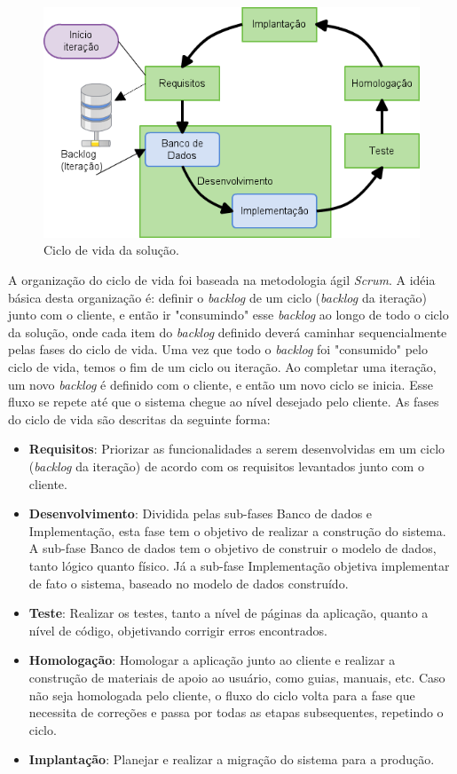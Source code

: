 \begin{figure}[!htb]
	\centering
		\includegraphics[scale=0.8]{figuras/ciclo_vida_solucao}
	\caption{Ciclo de vida da solução.}
	\label{ciclo_vida_solucao}
\end{figure}

A organização do ciclo de vida foi baseada na metodologia ágil \textit{Scrum}. A idéia básica desta organização é: definir o \textit{backlog} de um ciclo (\textit{backlog} da iteração) junto com o cliente, e então ir "consumindo" esse \textit{backlog} ao longo de todo o ciclo da solução, onde cada item do \textit{backlog} definido deverá caminhar sequencialmente pelas fases do ciclo de vida. Uma vez que todo o \textit{backlog} foi "consumido" pelo ciclo de vida, temos o fim de um ciclo ou iteração. Ao completar uma iteração, um novo \textit{backlog} é definido com o cliente, e então um novo ciclo se inicia. Esse fluxo se repete até que o sistema chegue ao nível desejado pelo cliente. As fases do ciclo de vida são descritas da seguinte forma:

\begin{itemize}
\item \textbf{Requisitos}: Priorizar as funcionalidades a serem desenvolvidas em um ciclo (\textit{backlog} da iteração) de acordo com os requisitos levantados junto com o cliente.
\item \textbf{Desenvolvimento}: Dividida pelas sub-fases Banco de dados e Implementação, esta fase tem o objetivo de realizar a construção do sistema. A sub-fase Banco de dados tem o objetivo de construir o modelo de dados, tanto lógico quanto físico. Já a sub-fase Implementação objetiva implementar de fato o sistema, baseado no modelo de dados construído.
\item \textbf{Teste}: Realizar os testes, tanto a nível de páginas da aplicação, quanto a nível de código, objetivando corrigir erros encontrados.
\item \textbf{Homologação}: Homologar a aplicação junto ao cliente e realizar a construção de materiais de apoio ao usuário, como guias, manuais, etc. Caso não seja homologada pelo cliente, o fluxo do ciclo volta para a fase que necessita de correções e passa por todas as etapas subsequentes, repetindo o ciclo.
\item \textbf{Implantação}: Planejar e realizar a migração do sistema para a produção.
\end{itemize}


